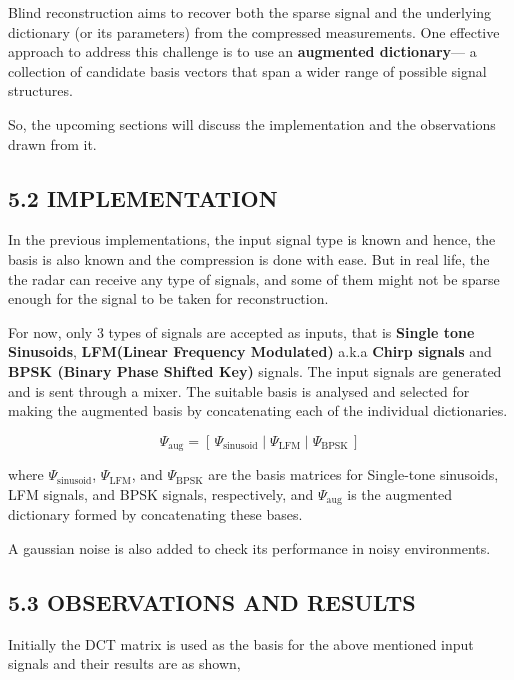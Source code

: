 \documentclass[
  letterpaper,
  DIV=11,
  numbers=noendperiod]{scrartcl}
\begin{document}
Blind reconstruction aims to recover both the sparse signal and the
underlying dictionary (or its parameters) from the compressed
measurements. One effective approach to address this challenge is to use
an \textbf{augmented dictionary}--- a collection of candidate basis
vectors that span a wider range of possible signal structures.

So, the upcoming sections will discuss the implementation and the
observations drawn from it.

\subsection{5.2 IMPLEMENTATION}\label{implementation}

In the previous implementations, the input signal type is known and
hence, the basis is also known and the compression is done with ease.
But in real life, the the radar can receive any type of signals, and
some of them might not be sparse enough for the signal to be taken for
reconstruction.

For now, only 3 types of signals are accepted as inputs, that is
\textbf{Single tone Sinusoids}, \textbf{LFM(Linear Frequency Modulated)}
a.k.a \textbf{Chirp signals} and \textbf{BPSK (Binary Phase Shifted
Key)} signals. The input signals are generated and is sent through a
mixer. The suitable basis is analysed and selected for making the
augmented basis by concatenating each of the individual dictionaries.

\begin{equation}
\boxed{
    \Psi_{\text{aug}} = \left[\, \Psi_{\text{sinusoid}} \;\Big|\; \Psi_{\text{LFM}} \;\Big|\; \Psi_{\text{BPSK}} \,\right]
}
\end{equation}

where \(\Psi_{\text{sinusoid}}\), \(\Psi_{\text{LFM}}\), and
\(\Psi_{\text{BPSK}}\) are the basis matrices for Single-tone sinusoids,
LFM signals, and BPSK signals, respectively, and \(\Psi_{\text{aug}}\)
is the augmented dictionary formed by concatenating these bases.

A gaussian noise is also added to check its performance in noisy
environments.

\subsection{5.3 OBSERVATIONS AND
RESULTS}\label{observations-and-results}

Initially the DCT matrix is used as the basis for the above mentioned
input signals and their results are as shown,
\end{document}
